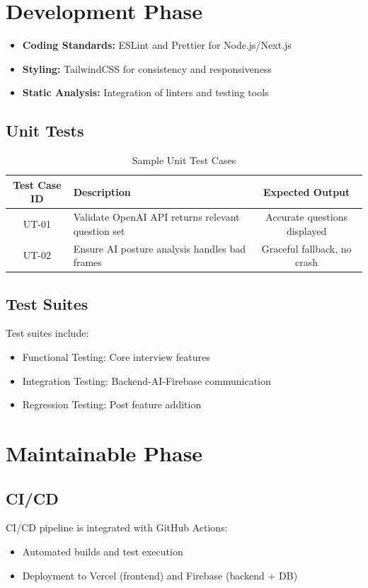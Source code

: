 \section{Development Phase}
\begin{itemize}
  \item \textbf{Coding Standards:} ESLint and Prettier for Node.js/Next.js
  \item \textbf{Styling:} TailwindCSS for consistency and responsiveness
  \item \textbf{Static Analysis:} Integration of linters and testing tools
\end{itemize}

\subsection{Unit Tests}
\begin{table}[!htbp]
\centering
\begin{tabular}{|c|p{8cm}|c|}
\hline
\textbf{Test Case ID} & \textbf{Description} & \textbf{Expected Output} \\
\hline
UT-01 & Validate OpenAI API returns relevant question set & Accurate questions displayed \\
\hline
UT-02 & Ensure AI posture analysis handles bad frames & Graceful fallback, no crash \\
\hline
\end{tabular}
\caption{Sample Unit Test Cases}
\label{tab:unit-test-cases}
\end{table}

\subsection{Test Suites}
Test suites include:
\begin{itemize}
  \item Functional Testing: Core interview features
  \item Integration Testing: Backend-AI-Firebase communication
  \item Regression Testing: Post feature addition
\end{itemize}

\section{Maintainable Phase}

\subsection{CI/CD}
CI/CD pipeline is integrated with GitHub Actions:
\begin{itemize}
  \item Automated builds and test execution
  \item Deployment to Vercel (frontend) and Firebase (backend + DB)
\end{itemize}

